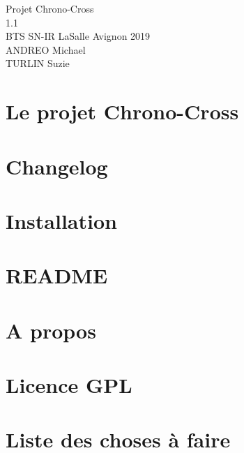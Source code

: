 \documentclass[twoside]{article}
\newcommand{\+}{\discretionary{\mbox{\scriptsize$\hookleftarrow$}}{}{}}
\begin{document}
\hypersetup{pageanchor=false,
             bookmarksnumbered=true,
             pdfencoding=unicode
            }
\begin{titlepage}
\vspace*{7cm}
\begin{center}%
{\LARGE Projet Chrono-\/\+Cross \\[1ex]\large 1.\+1 }\\
\vspace*{1cm}
{\large BTS SN-IR LaSalle Avignon 2019}\\
\vspace*{1cm}
{\large ANDREO Michael}\\
{\large TURLIN Suzie}\\
\end{center}
\end{titlepage}
\tableofcontents
{}
\hypersetup{pageanchor=true}

\section{Le projet Chrono-\/\+Cross}
\label{index}\hypertarget{index}{}
\section{Changelog}
\label{page_changelog}

\section{Installation}
\label{page_install}

\section{R\+E\+A\+D\+ME}
\label{page__r_e_a_d_m_e}

\section{A propos}
\label{page_about}

\section{Licence G\+PL}
\label{page_licence}

\section{Liste des choses à faire}
\label{todo}

\end{document}
